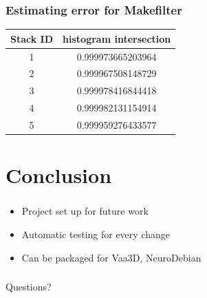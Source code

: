 \documentclass{beamer}
\begin{document}
\begin{frame}\frametitle{Estimating error for Makefilter}
	\centering
	\begin{tabular}{cc}
		\toprule
                  \be{}Stack ID                              & \be{} histogram intersection \\                   
		\midrule
			1 & 0.999973665203964 \\
			2 & 0.999967508148729 \\
			3 & 0.999978416844418 \\
			4 & 0.999982131154914 \\
			5 & 0.999959276433577 \\
		\bottomrule
        \end{tabular}
\end{frame}

\section{Conclusion}
\begin{frame}\frametitle{\secname}
	\begin{itemize}
		\item<1-> Project set up for future work
		\item<2-> Automatic testing for every change
		\item<3-> Can be packaged for Vaa3D, NeuroDebian
	\end{itemize}
\end{frame}

\begin{frame}\frametitle{\secname}
	\centering\Huge Questions?
\end{frame}

\end{document}
